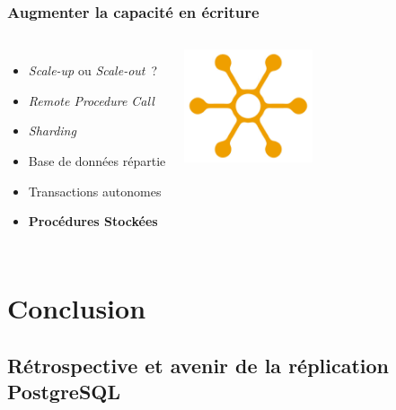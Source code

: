 \documentclass[english]{beamer}
\begin{document}
\begin{frame}[fragile]
  \frametitle{Augmenter la capacité en écriture}

  \linebreak
  \linebreak

\begin{columns}[c]

  \begin{itemize}
   \item<1-> \textit{Scale-up} ou \textit{Scale-out} ?
   \item<2-> \textit{Remote Procedure Call}
   \item<3-> \textit{Sharding}
   \item<3-> Base de données répartie
   \item<4-> Transactions autonomes
   \item<5-> \textbf{Procédures Stockées}
  \end{itemize}  

\includegraphics[height=9em]{distribution.jpg}
\end{columns}
\end{frame}



\section{Conclusion}

\subsection{Rétrospective et avenir de la réplication PostgreSQL}
\end{document}
